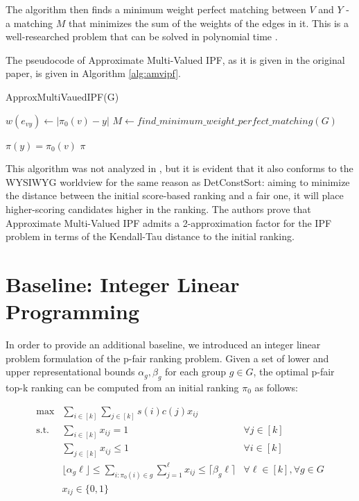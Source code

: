 The algorithm then finds a minimum weight perfect matching between $V$ and $Y$ - a matching $M$ that minimizes the sum of the weights of the edges in it. This is a well-researched problem that can be solved in polynomial time \cite{doi:10.1287/ijoc.11.2.138}.

The pseudocode of Approximate Multi-Valued IPF, as it is given in the original paper, is given in Algorithm \ref{alg:amvipf}. 

\begin{algorithm}[h]
\caption{\small{ApproxMultiVauedIPF(G)}}
\label{alg:amvipf}
\small
\begin{algorithmic}[1]

	\STATE $w(e_{vy}) \leftarrow |\pi_0(v) - y|$
\ENDFOR
\STATE $M \leftarrow find\_minimum\_weight\_perfect\_matching(G)$

	\STATE $\pi(y) = \pi_0(v)$
\ENDFOR
\RETURN $\pi$
\end{algorithmic}
\vspace{-1ex}
\end{algorithm}

This algorithm was not analyzed in \cite{3533380}, but it is evident that it also conforms to the WYSIWYG worldview for the same reason as DetConstSort: aiming to minimize the distance between the initial score-based ranking and a fair one, it will place higher-scoring candidates higher in the ranking. The authors prove that Approximate Multi-Valued IPF admits a 2-approximation factor for the IPF problem in terms of the Kendall-Tau distance to the initial ranking.

\section{Baseline: Integer Linear Programming}\label{sect:ilp}

In order to provide an additional baseline, we introduced an integer linear problem formulation of the p-fair ranking problem. Given a set of lower and upper representational bounds $\alpha_g, \beta_g$ for each group $g\in G$, the optimal p-fair top-k ranking can be computed from an initial ranking $\pi_0$ as follows:

\begin{align*}
\max & \sum_{i \in [k]} \sum_{j \in [k]} s(i) c(j) x_{ij} &  \\
%
 \mbox{s.t.} & \sum_{i \in [k]} x_{ij}  = 1 & \forall j \in [k] \\
%
 & \sum_{j \in [k]} x_{ij}  \leq 1 & \forall i \in [k]\\
%
 & \lfloor \alpha_g \ell \rfloor \leq \sum_{i: \pi_0(i) \in g} \sum_{j = 1}^\ell x_{ij}  \leq \lceil \beta_g \ell \rceil & \forall \ell \in [k], \forall g \in G
\\
%
&  x_{ij} \in \{ 0, 1 \}
\end{align*}
%

